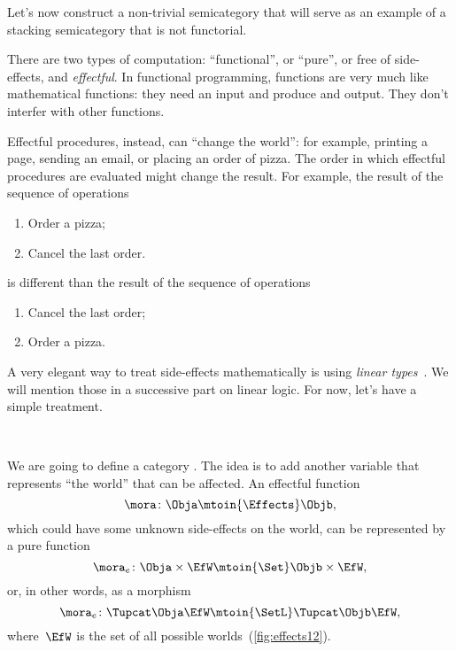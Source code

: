 Let's now construct a non-trivial semicategory that will serve as an example of a stacking semicategory that is not functorial.

There are two types of computation: ``functional'', or ``pure'', or free of side-effects, and \emph{effectful}.
In functional programming, functions are very much like mathematical functions: they need an input and produce and output.
They don't interfer with other functions.

Effectful procedures,  instead, can ``change the world'': for example, printing a page, sending an email, or placing an order of pizza.
The order in which effectful procedures are evaluated might change the result.
For example, the result of the sequence of operations
%
\begin{enumerate}
    \item Order a pizza;
    \item Cancel the last order.
\end{enumerate}
%
is different than the result of the sequence of operations
%
\begin{enumerate}
    \item Cancel the last order;
    \item Order a pizza.
\end{enumerate}

A very elegant way to treat side-effects mathematically is using \emph{linear types}~\cite{Wadler90lineartypes}.
We will mention those in a successive part on linear logic.
For now, let's have a simple treatment.

\begin{marginfigure}
    \centering
    \\
    \caption{}
    \label{fig:effects12}
\end{marginfigure}

We are going to define a category \Effects.
The idea is to add another variable that represents ``the world'' that can be affected.
An effectful function
%
\begin{equation}
    \mora\colon \Obja \mtoin{\Effects} \Objb,
\end{equation}
%
which could have some unknown side-effects on the world, can be represented by a pure function
\begin{equation}
  \mora_e\colon  \Obja  \times \EfW \mtoin{\Set}   \Objb \times \EfW,
\end{equation}
or, in other words, as a morphism
\begin{equation}
    \mora_e\colon  \Tupcat \Obja   \EfW \mtoin{\SetL}   \Tupcat  \Objb \EfW,
\end{equation}
%
where~$\EfW$ is the set of all possible worlds~(\cref{fig:effects12}).

